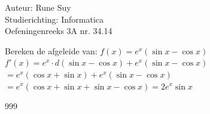\documentclass[a4paper]{article}
\begin{document}
  
\noindent \large Auteur: Rune Suy \\
\noindent \large Studierichting: Informatica\\
\noindent \large Oefeningenreeks 3A nr. 34.14\\

\medskip

\normalsize

Bereken de afgeleide van: $f(x) = e^x (\sin x - \cos x)$\\

$f'(x) = e^x \cdot d(\sin x - \cos x) + e^x (\sin x - \cos x)$\\

$= e^x (\cos x + \sin x) + e^x (\sin x - \cos x)$\\

$= e^x (\cos x + \sin x + \sin x - \cos x) = 2 e^x \sin x$\\

\begin{thebibliography}{999}
\end{thebibliography}
\end{document}
